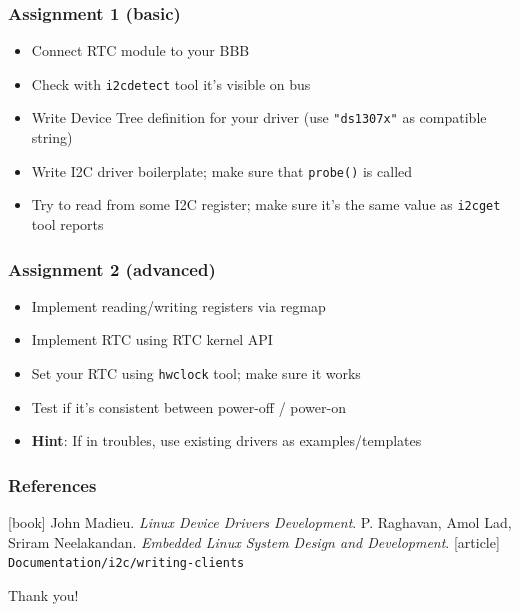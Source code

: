 \documentclass[aspectratio=169,usenames,dvipsnames]{beamer}
\begin{document}
\begin{frame}
  \frametitle{Assignment 1 (basic)}
  \begin{itemize}
    \item Connect RTC module to your BBB
    \item Check with \texttt{i2cdetect} tool it's visible on bus
    \item Write Device Tree definition for your driver (use \texttt{"ds1307x"}
          as compatible string)
    \item Write I2C driver boilerplate; make sure that \texttt{probe()} is
          called
    \item Try to read from some I2C register; make sure it's the same value as
          \texttt{i2cget} tool reports
  \end{itemize}
\end{frame}

\begin{frame}
  \frametitle{Assignment 2 (advanced)}
  \begin{itemize}
    \item Implement reading/writing registers via regmap
    \item Implement RTC using RTC kernel API
    \item Set your RTC using \texttt{hwclock} tool; make sure it works
    \item Test if it's consistent between power-off / power-on
    \item \textbf{Hint}: If in troubles, use existing drivers as
          examples/templates
  \end{itemize}
\end{frame}

\begin{frame}
  \frametitle{References}
  \begin{thebibliography}{}
  [book]
    John Madieu.
    \newblock \emph{Linux Device Drivers Development}.
    P. Raghavan, Amol Lad, Sriram Neelakandan.
    \newblock \emph{Embedded Linux System Design and Development}.
  [article]
   \texttt{Documentation/i2c/writing-clients}
  \end{thebibliography}
\end{frame}

\begin{frame}[standout]
  Thank you!
\end{frame}

\end{document}
